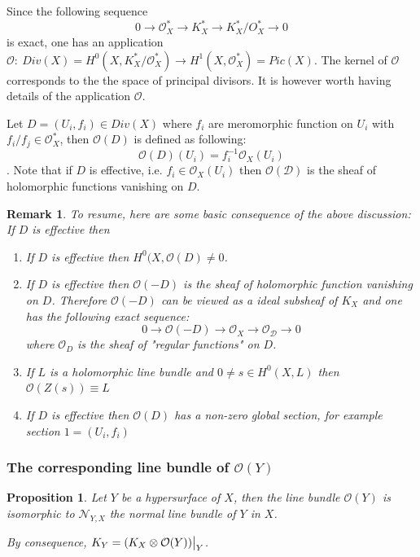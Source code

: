 \documentclass[11pt]{article}
\newtheorem{remark}{Remark}
\newtheorem{proposition}{Proposition}[theorem]
\newcommand\restr[2]{{%
\left.\kern-\nulldelimiterspace %
#1 %
\vphantom{\big|} %
\right|_{#2} %
}}
\begin{document}
Since the following sequence
\[
0 \longrightarrow \mathcal{O}_X^* \longrightarrow K_X^* \longrightarrow K_X^*/O_X^* \longrightarrow 0
\]
is exact, one has an application \(\mathcal{O}:\ Div(X) = H^0(X, K_X^*/\mathcal{O}_X^*)
\longrightarrow  H^1(X, \mathcal{O}_X^*) = Pic(X)\). The kernel of \(\mathcal{O}\)
corresponds to the the space of principal divisors. It is however worth having details
of the application \(\mathcal{O}\).

Let \(D = (U_i,f_i)\in Div(X)\) where \(f_i\) are meromorphic function on \(U_i\)
with \(f_i/f_j\in \mathcal{O}_X^*\), then \(\mathcal{O}(D)\) is defined as following:
\[
\mathcal{O}(D) (U_i) = f_i^{-1}\mathcal{O}_X(U_i)
\]. Note that if \(D\) is effective, i.e. \(f_i\in \mathcal{O}_X(U_i)\) then \(\mathcal{O(D)}\) is the sheaf of holomorphic functions vanishing on \(D\).


\begin{remark}
To resume, here are some basic consequence of the above discussion: If \(D\) is
effective then
\begin{enumerate}
\item If \(D\) is effective then \(H^0(X, \mathcal{O}(D) \ne 0\).
\item If \(D\) is effective then \(\mathcal{O}(-D)\) is the sheaf of holomorphic
function vanishing on \(D\). Therefore \(\mathcal{O}(-D)\) can be viewed as a
ideal subsheaf of \(K_X\) and one has the following exact sequence: 
\[
   0 \longrightarrow \mathcal{O}(-D) \longrightarrow \mathcal{O}_X \longrightarrow
   \mathcal{O_D} \longrightarrow 0
   \]
where \(\mathcal{O}_D\) is the sheaf of "regular functions" on \(D\).
\item If \(L\) is a holomorphic line bundle and \(0\ne s\in H^0(X,L)\) then \(\mathcal{O}(Z(s)) \equiv L\)
\item If \(D\) is effective then \(\mathcal{O}(D)\) has a non-zero global section, for
example section \(1 = (U_i, f_i)\)
\end{enumerate}
\end{remark}

\subsubsection{The corresponding line bundle of \(\mathcal{O}(Y)\)}
\label{sec:org6356d3f}

\begin{proposition}
Let \(Y\) be a hypersurface of \(X\), then the line bundle \(\mathcal{O}(Y)\) is
isomorphic to \(\mathcal{N}_{Y,X}\) the normal line bundle of \(Y\) in \(X\).

By consequence, \(K_Y = \restr{(K_X\otimes \mathcal{O}(Y))}{Y}\).
\end{proposition}
\end{document}
